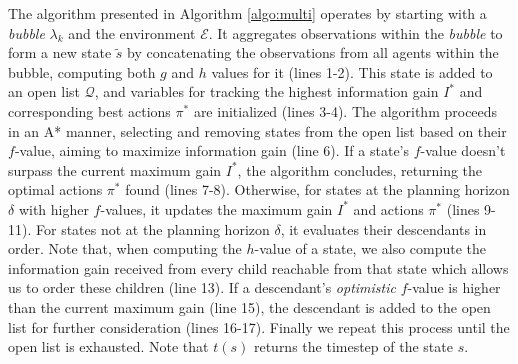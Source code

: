 \documentclass[letterpaper, 10 pt, conference]{IEEEConference}
\begin{document}
The  algorithm presented in Algorithm \ref{algo:multi} operates by starting with a \textit{bubble} $\lambda_k$ and the environment $\mathcal{E}$. It aggregates observations within the \textit{bubble} to form a new state $\tilde{s}$ by concatenating the observations from all agents within the bubble, computing both $g$ and $h$ values for it (lines 1-2). This state is added to an open list $\mathcal{Q}$, and variables for tracking the highest information gain $I^*$ and corresponding best actions $\pi^*$ are initialized (lines 3-4). The algorithm proceeds in an A* manner, selecting and removing states from the open list based on their $f$-value, aiming to maximize information gain (line 6). If a state's $f$-value doesn't surpass the current maximum gain $I^*$, the algorithm concludes, returning the optimal actions $\pi^*$ found (lines 7-8). Otherwise, for states at the planning horizon $\delta$ with higher $f$-values, it updates the maximum gain $I^*$ and actions $\pi^*$ (lines 9-11). For states not at the planning horizon $\delta$, it evaluates their descendants in order. Note that, when computing the $h$-value of a state, we also compute the information gain received from every child reachable from that state which allows us to order these children (line 13). If a descendant's \textit{optimistic} $f$-value is higher than the current maximum gain (line 15), the descendant is added to the open list for further consideration (lines 16-17). Finally we repeat this process until the open list is exhausted. Note that $t(s)$ returns the timestep of the state $s$.
\end{document}
